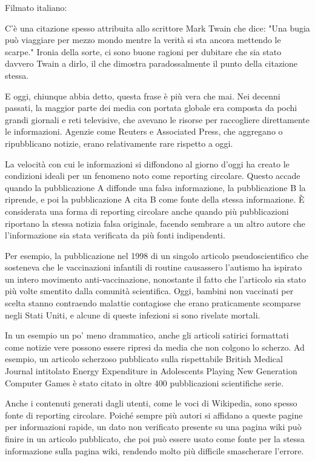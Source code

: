 \begin{itshape}Filmato italiano:

C'è una citazione spesso attribuita allo scrittore Mark Twain che dice: "Una bugia può viaggiare per mezzo mondo mentre la verità si sta ancora mettendo le scarpe." Ironia della sorte, ci sono buone ragioni per dubitare che sia stato davvero Twain a dirlo, il che dimostra paradossalmente il punto della citazione stessa.

E oggi, chiunque abbia detto, questa frase è più vera che mai. Nei decenni passati, la maggior parte dei media con portata globale era composta da pochi grandi giornali e reti televisive, che avevano le risorse per raccogliere direttamente le informazioni. Agenzie come Reuters e Associated Press, che aggregano o ripubblicano notizie, erano relativamente rare rispetto a oggi.

La velocità con cui le informazioni si diffondono al giorno d'oggi ha creato le condizioni ideali per un fenomeno noto come reporting circolare. Questo accade quando la pubblicazione A diffonde una falsa informazione, la pubblicazione B la riprende, e poi la pubblicazione A cita B come fonte della stessa informazione. È considerata una forma di reporting circolare anche quando più pubblicazioni riportano la stessa notizia falsa originale, facendo sembrare a un altro autore che l'informazione sia stata verificata da più fonti indipendenti.

Per esempio, la pubblicazione nel 1998 di un singolo articolo pseudoscientifico che sosteneva che le vaccinazioni infantili di routine causassero l’autismo ha ispirato un intero movimento anti-vaccinazione, nonostante il fatto che l’articolo sia stato più volte smentito dalla comunità scientifica. Oggi, bambini non vaccinati per scelta stanno contraendo malattie contagiose che erano praticamente scomparse negli Stati Uniti, e alcune di queste infezioni si sono rivelate mortali.

In un esempio un po’ meno drammatico, anche gli articoli satirici formattati come notizie vere possono essere ripresi da media che non colgono lo scherzo. Ad esempio, un articolo scherzoso pubblicato sulla rispettabile British Medical Journal intitolato Energy Expenditure in Adolescents Playing New Generation Computer Games è stato citato in oltre 400 pubblicazioni scientifiche serie.

Anche i contenuti generati dagli utenti, come le voci di Wikipedia, sono spesso fonte di reporting circolare. Poiché sempre più autori si affidano a queste pagine per informazioni rapide, un dato non verificato presente su una pagina wiki può finire in un articolo pubblicato, che poi può essere usato come fonte per la stessa informazione sulla pagina wiki, rendendo molto più difficile smascherare l’errore.


\end{itshape}
